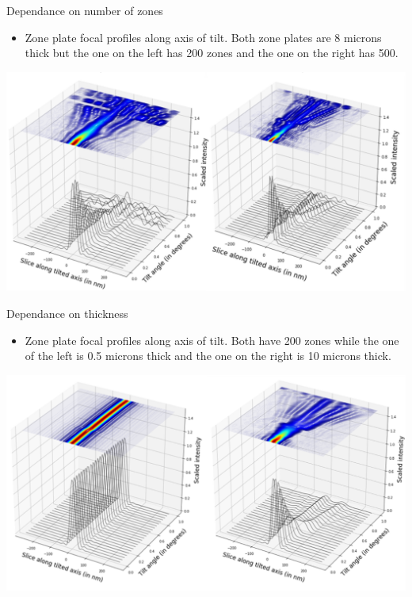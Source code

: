 \documentclass{beamer}
\begin{document}
\begin{frame}{Dependance on number of zones}
\begin{itemize}
	\item Zone plate focal profiles along axis of tilt. Both zone plates are 8 microns thick but the one on the left has 200 zones and the one on the right has 500. 
\end{itemize}
\begin{center}
	\includegraphics[scale=0.425]{8_200_500}
\end{center}
\end{frame}

\begin{frame}{Dependance on thickness}
\begin{itemize}
	\item Zone plate focal profiles along axis of tilt. Both have 200 zones while the one of the left is 0.5 microns thick and the one on the right is 10 microns thick.
	
\end{itemize}
\begin{center}
	\includegraphics[scale=0.425]{200_half_ten}
\end{center}
\end{frame}
\end{document}
